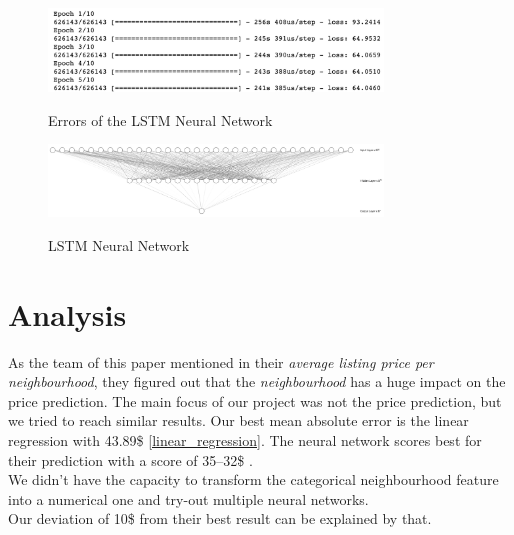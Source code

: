 \documentclass[journal]{IEEEtran}
\begin{document}
\begin{figure}
  \begin{center}
  \includegraphics[width=3.5in]{photo/lstm.png}\\
  \caption{Errors of the LSTM Neural Network}\label{nn}
  \end{center}
\end{figure}

\begin{figure}
  \begin{center}
  \includegraphics[width=3.5in]{photo/nn.png}\\
  \caption{LSTM Neural Network}\label{lstm}
  \end{center}
\end{figure}

\section{Analysis}

As the team of this paper \cite{RN1} mentioned in their \textit{average listing price per neighbourhood}, they figured out that the \textit{neighbourhood} has a huge impact on the price prediction. The main focus of our project was not the price prediction, but we tried to reach similar results. Our best mean absolute error is the linear regression with 43.89\$ \ref{linear_regression}. The neural network scores best for their prediction with a score of 35–32\$ \cite{RN1}. \\
We didn't have the capacity to transform the categorical neighbourhood feature into a numerical one and try-out multiple neural networks. \\
Our deviation of 10\$ from their best result can be explained by that.
\end{document}
